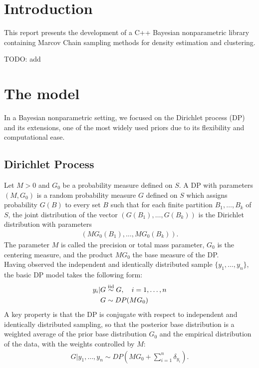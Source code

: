 \section{Introduction}
This report presents the development of a C++ Bayesian nonparametric library containing Marcov Chain sampling methods for density estimation and clustering. 

TODO: add

\section{The model}
In a Bayesian nonparametric setting, we focused on the Dirichlet process (DP) and its extensions, one of the most widely used priors due to its flexibility and computational ease.

\subsection{Dirichlet Process}
Let $M>0$ and $G_0$ be a probability measure defined on $S$. A DP with parameters $(M,G_0)$ is a random probability measure $G$ defined on $S$ which assigns probability $G(B)$ to every set $B$ such that for each finite partition ${B_1,\dots,B_k}$ of $S$, the joint distribution of the  vector $(G(B_1),\dots,G(B_k))$ is the Dirichlet distribution with parameters
\begin{align*}
(MG_0(B_1),\dots,MG_0(B_k)).
\end{align*}
The parameter $M$ is called the precision or total mass parameter, $G_0$ is
the centering measure, and the product $MG_0$ the base measure
of the DP. \\
Having observed the independent and identically distributed sample $\{y_1,\dots,y_n\}$, the basic DP model takes the following form:
\begin{equation}
	\begin{aligned}
	y_i | G &\stackrel{\text{iid}}{\sim} G, \quad i=1,\dots,n \\
	G &\sim DP(MG_0)
	\end{aligned}
\end{equation}
A key property is that the DP is conjugate with respect to independent and identically distributed sampling, so that the posterior base distribution is a weighted average of the prior base distribution $G_0$ and the empirical distribution of the data, with the weights controlled by $M$:
\begin{align}
	G | y_1,\dots,y_n \sim DP\left(M G_0 + \sum_{i=1}^n \delta_{y_i}\right).
\end{align}
